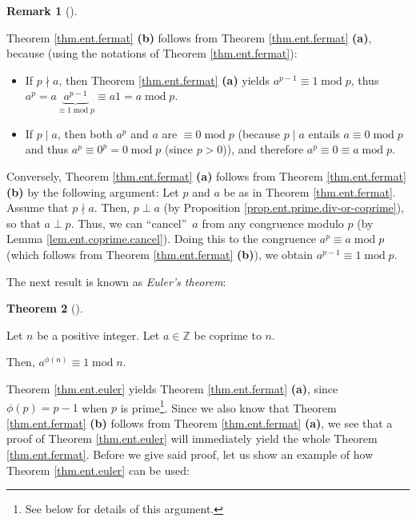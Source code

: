 \documentclass[numbers=enddot,12pt,final,onecolumn,notitlepage]{scrartcl}%
\numberwithin{exer}{subsection}
\theoremstyle{definition}
\newtheorem{theo}{Theorem}[subsection]
\newenvironment{theorem}[1][]
{\begin{theo}[#1]\begin{leftbar}}
{\end{leftbar}\end{theo}}
\newtheorem{remk}[theo]{Remark}
\newenvironment{remark}[1][]
{\begin{remk}[#1]\begin{leftbar}}
{\end{leftbar}\end{remk}}
\begin{document}
\begin{remark}
Theorem \ref{thm.ent.fermat} \textbf{(b)} follows from Theorem
\ref{thm.ent.fermat} \textbf{(a)}, because (using the notations of Theorem
\ref{thm.ent.fermat}):

\begin{itemize}
\item If $p\nmid a$, then Theorem \ref{thm.ent.fermat} \textbf{(a)} yields
$a^{p-1}\equiv1\operatorname{mod}p$, thus $a^{p}=a\underbrace{a^{p-1}}%
_{\equiv1\operatorname{mod}p}\equiv a1=a\operatorname{mod}p$.

\item If $p\mid a$, then both $a^{p}$ and $a$ are $\equiv0\operatorname{mod}p$
(because $p\mid a$ entails $a\equiv0\operatorname{mod}p$ and thus $a^{p}%
\equiv0^{p}=0\operatorname{mod}p$ (since $p>0$)), and therefore $a^{p}%
\equiv0\equiv a\operatorname{mod}p$.
\end{itemize}

Conversely, Theorem \ref{thm.ent.fermat} \textbf{(a)} follows from Theorem
\ref{thm.ent.fermat} \textbf{(b)} by the following argument: Let $p$ and $a$
be as in Theorem \ref{thm.ent.fermat}. Assume that $p\nmid a$. Then, $p\perp
a$ (by Proposition \ref{prop.ent.prime.div-or-coprime}), so that $a\perp p$.
Thus, we can \textquotedblleft cancel\textquotedblright\ $a$ from any
congruence modulo $p$ (by Lemma \ref{lem.ent.coprime.cancel}). Doing this to
the congruence $a^{p}\equiv a\operatorname{mod}p$ (which follows from Theorem
\ref{thm.ent.fermat} \textbf{(b)}), we obtain $a^{p-1}\equiv
1\operatorname{mod}p$.
\end{remark}

The next result is known as \textit{Euler's theorem}:

\begin{theorem}
\label{thm.ent.euler}Let $n$ be a positive integer. Let $a\in\mathbb{Z}$ be
coprime to $n$.

Then, $a^{\phi\left(  n\right)  }\equiv1\operatorname{mod}n$.
\end{theorem}

Theorem \ref{thm.ent.euler} yields Theorem \ref{thm.ent.fermat} \textbf{(a)},
since $\phi\left(  p\right)  =p-1$ when $p$ is prime\footnote{See below for
details of this argument.}. Since we also know that Theorem
\ref{thm.ent.fermat} \textbf{(b)} follows from Theorem \ref{thm.ent.fermat}
\textbf{(a)}, we see that a proof of Theorem \ref{thm.ent.euler} will
immediately yield the whole Theorem \ref{thm.ent.fermat}. Before we give said
proof, let us show an example of how Theorem \ref{thm.ent.euler} can be used:
\end{document}
